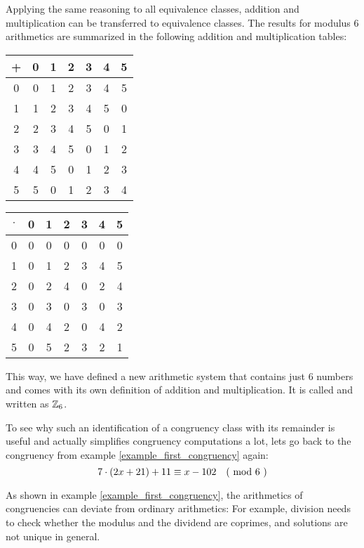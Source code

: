 \begin{example} 
Applying the same reasoning to all equivalence classes, addition and multiplication can  be transferred to  equivalence classes. The results for modulus $6$ arithmetics are summarized in the following addition and multiplication tables:
\begin{center}
  \begin{tabular}{c | c c c c c c}
    + & 0 & 1 & 2 & 3 & 4 & 5\\\hline
    0 & 0 & 1 & 2 & 3 & 4 & 5 \\
    1 & 1 & 2 & 3 & 4 & 5 & 0\\
    2 & 2 & 3 & 4 & 5 & 0 & 1\\
    3 & 3 & 4 & 5 & 0 & 1 & 2\\
    4 & 4 & 5 & 0 & 1 & 2 & 3\\
    5 & 5 & 0 & 1 & 2 & 3 & 4
  \end{tabular} \quad \quad \quad \quad
  \begin{tabular}{c | c c c c c c}
$ \cdot $ & 0 & 1 & 2 & 3 & 4 & 5 \\\hline
        0 & 0 & 0 & 0 & 0 & 0 & 0\\
        1 & 0 & 1 & 2 & 3 & 4 & 5\\
        2 & 0 & 2 & 4 & 0 & 2 & 4\\
        3 & 0 & 3 & 0 & 3 & 0 & 3\\
        4 & 0 & 4 & 2 & 0 & 4 & 2\\
        5 & 0 & 5 & 2 & 3 & 2 & 1
  \end{tabular}
\end{center}
This way, we have defined a new arithmetic system that contains just $6$ numbers and comes with its own definition of addition and multiplication. It is called and written as $\mathbb{Z}_6$.

To see why such an identification of a congruency class with its remainder is useful and actually simplifies congruency computations a lot, lets go back to the congruency from example \ref{example_first_congruency} again:
\begin{equation}
\label{example_congruency_two_1}
7\cdot(2x+21) + 11 \equiv x-102 \quad \text{( mod } 6 \text{ )}
\end{equation}

As shown in example \ref{example_first_congruency}, the arithmetics of congruencies can deviate from ordinary arithmetics: For example, division needs to check whether the modulus and the dividend are coprimes, and solutions are not unique in general.


\end{example}
